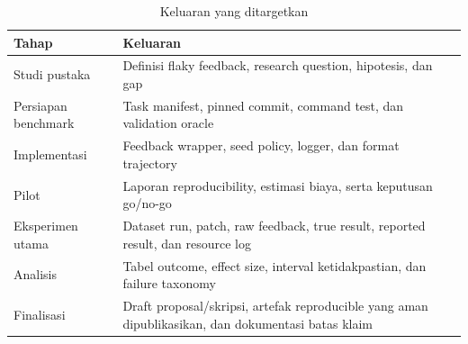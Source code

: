 \begin{table}[htbp]
\centering
\small
\renewcommand{\arraystretch}{1.25}
\caption{Keluaran yang ditargetkan}
\label{tab:deliverables}
\begin{tabularx}{\textwidth}{p{4.0cm}Y}
\toprule
\textbf{Tahap} & \textbf{Keluaran} \\
\midrule
Studi pustaka & Definisi flaky feedback, research question, hipotesis, dan gap \\
Persiapan benchmark & Task manifest, pinned commit, command test, dan validation oracle \\
Implementasi & Feedback wrapper, seed policy, logger, dan format trajectory \\
Pilot & Laporan reproducibility, estimasi biaya, serta keputusan go/no-go \\
Eksperimen utama & Dataset run, patch, raw feedback, true result, reported result, dan resource log \\
Analisis & Tabel outcome, effect size, interval ketidakpastian, dan failure taxonomy \\
Finalisasi & Draft proposal/skripsi, artefak reproducible yang aman dipublikasikan, dan dokumentasi batas klaim \\
\bottomrule
\end{tabularx}
\end{table}
